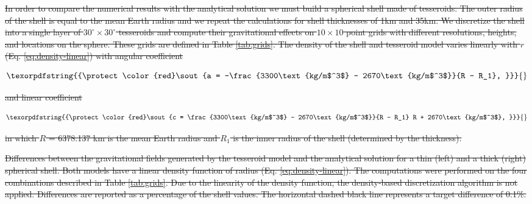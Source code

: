 \documentclass[extra, referee]{gji}
\providecommand{\DIFdeltex}[1]{{\protect\color{red}\sout{#1}}}                      %
\providecommand{\DIFdelbegin}{} %
\providecommand{\DIFdelFL}[1]{\DIFdel{#1}} %
\providecommand{\DIFdel}[1]{\texorpdfstring{\DIFdeltex{#1}}{}} %
\newcommand{\DIFscaledelfig}{0.5}
\newlength{\DIFdelgraphicswidth} %
\newlength{\DIFdelgraphicsheight} %
\newcommand{\DIFdelincludegraphics}[2][]{%
\sbox{\DIFdelgraphicsbox}{\DIFOincludegraphics[#1]{#2}}%
\settoboxwidth{\DIFdelgraphicswidth}{\DIFdelgraphicsbox} %
\settoboxtotalheight{\DIFdelgraphicsheight}{\DIFdelgraphicsbox} %
\scalebox{\DIFscaledelfig}{%
\parbox[b]{\DIFdelgraphicswidth}{\usebox{\DIFdelgraphicsbox}\\[-\baselineskip] \rule{\DIFdelgraphicswidth}{0em}}\llap{\resizebox{\DIFdelgraphicswidth}{\DIFdelgraphicsheight}{%
\setlength{\unitlength}{\DIFdelgraphicswidth}%
\begin{picture}(1,1)%
\thicklines\linethickness{2pt} %
{\color[rgb]{1,0,0}\put(0,0){\framebox(1,1){}}}%
{\color[rgb]{1,0,0}\put(0,0){\line( 1,1){1}}}%
{\color[rgb]{1,0,0}\put(0,1){\line(1,-1){1}}}%
\end{picture}%
}\hspace*{3pt}}} %
} %
\DeclareRobustCommand{\DIFdelbegin}{\DIFOdelbegin \let\includegraphics\DIFdelincludegraphics} %
\begin{document}
\DIFdelbegin \DIFdel{In order to compare the numerical results with the analytical solution we
must build a spherical shell made of tesseroids.
The outer radius of the shell is equal to the mean Earth radius and we repeat the
calculations for shell thicknesses of 1km and 35km.
We discretize the shell into a single layer of $30^\circ \times 30^\circ$ tesseroids and
compute their gravitational effects on $10 \times 10$ point grids with different
resolutions, heights, and locations on the sphere.
These grids are defined in Table \ref{tab:grids}.
The density of the shell and tesseroid model varies linearly with $r$
(Eq. \ref{eq:density-linear}) with angular coefficient
}%

\begin{displaymath}
    \DIFdel{a = -\frac{3300\text{kg/m$^3$} - 2670\text{kg/m$^3$}}{R - R_1},
}\end{displaymath}%

\DIFdel{and linear coefficient
}%

\begin{displaymath}
    \DIFdel{c = \frac{3300\text{kg/m$^3$} -
        2670\text{kg/m$^3$}}{R - R_1} R +
        2670\text{kg/m$^3$},
}\end{displaymath}%

\DIFdel{in which $R$ = 6378.137 km is the mean Earth radius and $R_1$ is the inner radius of the
shell (determined by the thickness).
}%

{%
\DIFdelFL{Differences between the gravitational fields generated by the tesseroid model
    and the analytical solution for a thin (left) and a thick (right) spherical shell.
    Both models have a linear density function of radius (Eq. \ref{eq:density-linear}).
    The computations were performed on the four combinations described in
    Table \ref{tab:grids}.
    Due to the linearity of the density function, the density-based discretization
    algorithm is not applied.
    Differences are reported as a percentage of the shell values.
    The horizontal dashed black line represents a target difference of 0.1\%.
}}
\end{document}
